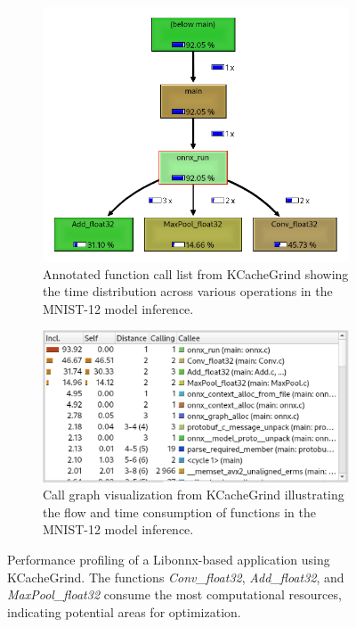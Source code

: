 \documentclass[fleqn,10pt]{olplainarticle}
\begin{document}
\begin{figure}[!ht]
    \centering
    \begin{subfigure}[b]{0.45\textwidth}
        \centering
        \includegraphics[width=\textwidth]{Images/libonnx.png}
        \caption{Annotated function call list from KCacheGrind showing the time distribution across various operations in the MNIST-12 model inference.}
        \label{fig:libonnx_tree}
    \end{subfigure}
    \hfill
    \begin{subfigure}[b]{0.45\textwidth}
        \centering
        \includegraphics[width=\textwidth]{Images/libonnx_ir.png}
        \caption{Call graph visualization from KCacheGrind illustrating the flow and time consumption of functions in the MNIST-12 model inference.}
        \label{fig:libonnx_ir}
    \end{subfigure}
    \caption{Performance profiling of a Libonnx-based application using KCacheGrind. The functions \textit{Conv\_float32}, \textit{Add\_float32}, and \textit{MaxPool\_float32} consume the most computational resources, indicating potential areas for optimization.}
    \label{fig:libonnx}
\end{figure}
\end{document}
